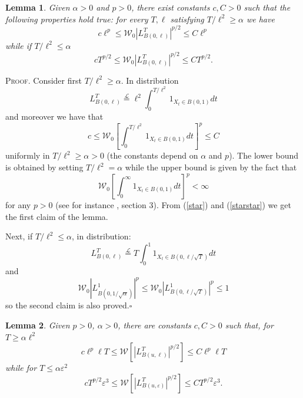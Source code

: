 \documentclass[a4paper,12pt]{article}
\newtheorem{lemma}{Lemma}
\begin{document}
\begin{lemma}
\label{lemma:Lzero-moments} Given $\alpha>0$ and $p>0$, there exist constants
$c,C>0$ such that the following properties hold true: for every $T,\ell$
satisfying $T/\ell^{2}\geq\alpha$ we have
\[
c\ell^{p}\leq\mathcal{W}_{0}|L_{B(0,\ell)}^{T}|^{p/2}\leq C\ell^{p}%
\]
while if $T/\ell^{2}\leq\alpha$
\[
cT^{p/2}\leq\mathcal{W}_{0}|L_{B(0,\ell)}^{T}|^{p/2}\leq CT^{p/2}.
\]
\end{lemma}

\textsc{Proof.}\hspace{0.3cm} Consider first $T/\ell^{2}\geq\alpha$. In
distribution
\begin{equation}
L_{B(0,\ell)}^{T}\overset{\mathcal{L}}{=}\ell^{2}\int_{0}^{T/\ell^{2}}%
1_{X_{t}\in B(0,1)}dt \label{star}%
\end{equation}
and moreover we have that
\begin{equation}
c\leq\mathcal{W}_{0}\left[  \int_{0}^{T/\ell^{2}}1_{X_{t}\in B(0,1)}dt\right]
^{p}\leq C \label{starstar}%
\end{equation}
uniformly in $T/\ell^{2}\geq\alpha>0$ (the constants depend on $\alpha$ and
$p$). The lower bound is obtained by setting $T/\ell^{2}=\alpha$ while the
upper bound is given by the fact that
\[
\mathcal{W}_{0}\left[  \int_{0}^{\infty}1_{X_{t}\in B(0,1)}dt\right]
^{p}<\infty
\]
for any $p>0$ (see for instance \cite{Kac}, section 3). From (\ref{star}) and
(\ref{starstar}) we get the first claim of the lemma.

Next, if $T/\ell^{2}\leq\alpha$, in distribution:
\[
L_{B(0,\ell)}^{T}\overset{\mathcal{L}}{=}T\int_{0}^{1}1_{X_{t}\in
B(0,\ell/\sqrt{T})}dt
\]
and
\[
\mathcal{W}_{0}|L_{B(0,1/\sqrt{\alpha})}^{1}|^{p}\leq\mathcal{W}%
_{0}|L_{B(0,\ell/\sqrt{T})}^{1}|^{p}\leq1
\]
so the second claim is also proved.\hfill$\square$

\begin{lemma}
\label{lemma:definitive-L-bounds} Given $p>0$, $\alpha>0$, there are constants
$c,C>0$ such that, for $T\geq\alpha\ell^{2}$
\begin{equation}
c\ell^{p}\ell T\leq\mathcal{W}[|L_{B(u,\ell)}^{T}|^{p/2}]\leq C\ell^{p}\ell T
\label{eq:Lmoments-bound4}%
\end{equation}
while for $T\leq\alpha\varepsilon^{2}$
\begin{equation}
cT^{p/2}\varepsilon^{3}\leq\mathcal{W}[|L_{B(u,\varepsilon)}^{T}|^{p/2}]\leq
CT^{p/2}\varepsilon^{3}. \label{eq:Lmoments-bound4-bis}%
\end{equation}
\end{lemma}
\end{document}

